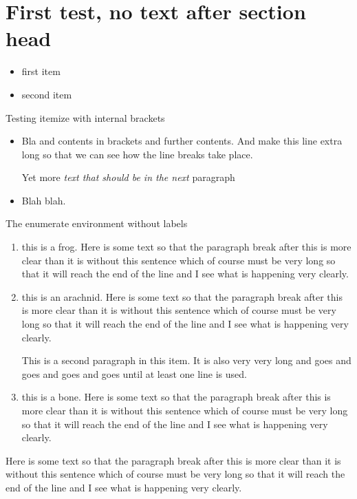﻿\documentclass{article}
\begin{document}
\section{First test, no text after section head}
\begin{itemize}
\item first item
\item second item
\end{itemize}

Testing itemize with internal brackets
\begin{itemize}
\item Bla {and contents in brackets} and further contents.  And make this 
line extra long so that we can see how the line breaks take place.

Yet more {\it text that should be in the next} paragraph
\item Blah blah.
\end{itemize}

 The
enumerate environment without labels
\begin{enumerate}
\item this is a frog. Here is some text so that the paragraph break after this
is more clear than it is without this sentence which of
course must be very long so that it will reach the end of
the line and I see what is happening very clearly.
\item this is an arachnid. Here is some text so that the paragraph break after this
is more clear than it is without this sentence which of
course must be very long so that it will reach the end of
the line and I see what is happening very clearly.

This is a second paragraph in this item.  It is also
very very long and goes and goes and goes and goes until
at least one line is used.

\item this is a bone. Here is some text so that the paragraph break after this
is more clear than it is without this sentence which of
course must be very long so that it will reach the end of
the line and I see what is happening very clearly.
\end{enumerate}
Here is some text so that the paragraph break after this
is more clear than it is without this sentence which of
course must be very long so that it will reach the end of
the line and I see what is happening very clearly.
\end{document}
